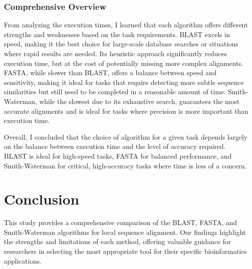 \documentclass{article}
\begin{document}
\subsubsection{Comprehensive Overview}
From analyzing the execution times, I learned that each algorithm offers different strengths and weaknesses based on the task requirements. BLAST excels in speed, making it the best choice for large-scale database searches or situations where rapid results are needed. Its heuristic approach significantly reduces execution time, but at the cost of potentially missing more complex alignments. FASTA, while slower than BLAST, offers a balance between speed and sensitivity, making it ideal for tasks that require detecting more subtle sequence similarities but still need to be completed in a reasonable amount of time. Smith-Waterman, while the slowest due to its exhaustive search, guarantees the most accurate alignments and is ideal for tasks where precision is more important than execution time. 

Overall, I concluded that the choice of algorithm for a given task depends largely on the balance between execution time and the level of accuracy required. BLAST is ideal for high-speed tasks, FASTA for balanced performance, and Smith-Waterman for critical, high-accuracy tasks where time is less of a concern.


\section{Conclusion}
This study provides a comprehensive comparison of the BLAST, FASTA, and Smith-Waterman algorithms for local sequence alignment. Our findings highlight the strengths and limitations of each method, offering valuable guidance for researchers in selecting the most appropriate tool for their specific bioinformatics applications.
\end{document}
